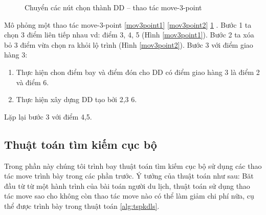 \documentclass[a4paper,12pt]{report}
\begin{document}
\begin{figure}[H]

\caption{Chuyển các nút chọn thành DD -- thao tác move-3-point}\label{mov3point3}
\end{figure}

Mô phỏng một thao tác move-3-point \ref{mov3point1} \ref{mov3point2} \ref{mov3point3} . Bước 1 ta chọn 3 điểm liên tiếp nhau vd:  điểm 3, 4, 5 (Hình \ref{mov3point1}). Bước 2 ta xóa bỏ 3 điểm vừa chọn ra khỏi lộ trình (Hình \ref{mov3point2}). Bước 3 với điểm giao hàng 3:\begin{enumerate}
\item Thực hiện chon điểm bay và điểm đón cho DD có điểm giao hàng 3 là điểm 2 và điểm 6.
\item Thực hiện xây dựng DD tạo bởi 2,3 6.
\end{enumerate} 
Lặp lại bước 3 với điểm 4,5.
\subsection{Thuật toán tìm kiếm cục bộ}
Trong phần này chúng tôi trình bay thuật toán tìm kiếm cục bộ sử dụng các thao tác move trình bày trong các phần trước. Ý tưởng của thuật toán như sau: Băt đầu từ từ một hành trình của bài toán người du lịch, thuật toán sử dụng thao tác move sao cho không còn thao tác move nào có thể làm giảm chi phí nữa, cụ thể được trình bày trong thuật toán \ref{alg:tspkdls}.
\end{document}
